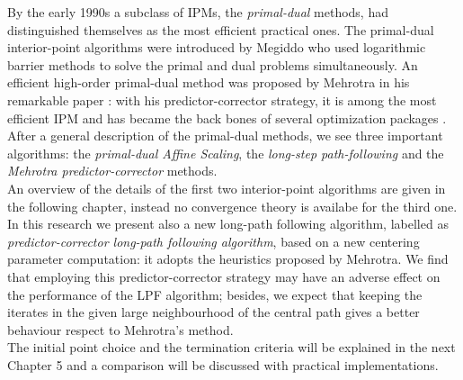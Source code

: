 \documentclass[a4paper,10 pt,titlepage,twoside]{report}
\theoremstyle{plain}
\theoremstyle{definition}
\theoremstyle{remark}
\begin{document}
By the early 1990s  a subclass of IPMs, the \textit{primal-dual} methods, had distinguished themselves as the most efficient practical ones. The primal-dual interior-point algorithms were introduced by Megiddo \cite{meg} who used logarithmic barrier methods to solve
the primal and dual problems simultaneously. An efficient
high-order primal-dual method was proposed by Mehrotra in his remarkable paper \cite{MER}: with his predictor-corrector
strategy, it is among the most efficient IPM and has became the back bones
of several optimization packages \cite{matlab}.\\ 
After a general description of the primal-dual methods, we see three important algorithms: the \textit{primal-dual Affine Scaling}, the \textit{long-step path-following} and the \textit{Mehrotra predictor-corrector} methods.\\
An overview of the details of the first two interior-point algorithms are given in the following chapter, instead no convergence theory is availabe for the third one. \\
In this research we present also a new long-path following algorithm, labelled as \textit{predictor-corrector long-path following algorithm}, based on a new centering parameter computation: it adopts the heuristics proposed by
Mehrotra. We find that employing this predictor-corrector strategy may have an adverse effect on the performance of the LPF algorithm; besides, we expect that keeping the iterates in the given large neighbourhood
of the central path gives a better behaviour respect to Mehrotra's method.\\ The initial point choice and the
termination criteria will be explained in the next Chapter 5 and a comparison will be discussed with practical implementations.

\newpage
\end{document}

